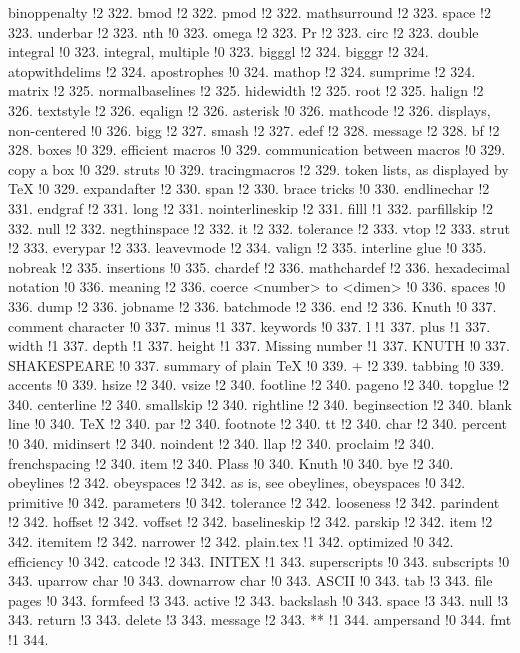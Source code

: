 binoppenalty !2 322.
bmod !2 322.
pmod !2 322.
mathsurround !2 323.
space !2 323.
underbar !2 323.
nth !0 323.
omega !2 323.
Pr !2 323.
circ !2 323.
double integral !0 323.
integral, multiple !0 323.
bigggl !2 324.
bigggr !2 324.
atopwithdelims !2 324.
apostrophes !0 324.
mathop !2 324.
sumprime !2 324.
matrix !2 325.
normalbaselines !2 325.
hidewidth !2 325.
root !2 325.
halign !2 326.
textstyle !2 326.
eqalign !2 326.
asterisk !0 326.
mathcode !2 326.
displays, non-centered !0 326.
bigg !2 327.
smash !2 327.
edef !2 328.
message !2 328.
bf !2 328.
boxes !0 329.
efficient macros !0 329.
communication between macros !0 329.
copy a box !0 329.
struts !0 329.
tracingmacros !2 329.
token lists, as displayed by TeX !0 329.
expandafter !2 330.
span !2 330.
brace tricks !0 330.
endlinechar !2 331.
endgraf !2 331.
long !2 331.
nointerlineskip !2 331.
filll !1 332.
parfillskip !2 332.
null !2 332.
negthinspace !2 332.
it !2 332.
tolerance !2 333.
vtop !2 333.
strut !2 333.
everypar !2 333.
leavevmode !2 334.
valign !2 335.
interline glue !0 335.
nobreak !2 335.
insertions !0 335.
chardef !2 336.
mathchardef !2 336.
hexadecimal notation !0 336.
meaning !2 336.
coerce <number> to <dimen> !0 336.
spaces !0 336.
dump !2 336.
jobname !2 336.
batchmode !2 336.
end !2 336.
Knuth !0 337.
comment character !0 337.
minus !1 337.
keywords !0 337.
l !1 337.
plus !1 337.
width !1 337.
depth !1 337.
height !1 337.
Missing number !1 337.
KNUTH !0 337.
SHAKESPEARE !0 337.
summary of plain TeX !0 339.
+ !2 339.
tabbing !0 339.
accents !0 339.
hsize !2 340.
vsize !2 340.
footline !2 340.
pageno !2 340.
topglue !2 340.
centerline !2 340.
smallskip !2 340.
rightline !2 340.
beginsection !2 340.
blank line !0 340.
TeX !2 340.
par !2 340.
footnote !2 340.
tt !2 340.
char !2 340.
percent !0 340.
midinsert !2 340.
noindent !2 340.
llap !2 340.
proclaim !2 340.
frenchspacing !2 340.
item !2 340.
Plass !0 340.
Knuth !0 340.
bye !2 340.
obeylines !2 342.
obeyspaces !2 342.
as is, see obeylines, obeyspaces !0 342.
primitive !0 342.
parameters !0 342.
tolerance !2 342.
looseness !2 342.
parindent !2 342.
hoffset !2 342.
voffset !2 342.
baselineskip !2 342.
parskip !2 342.
item !2 342.
itemitem !2 342.
narrower !2 342.
plain.tex !1 342.
optimized !0 342.
efficiency !0 342.
catcode !2 343.
INITEX !1 343.
superscripts !0 343.
subscripts !0 343.
uparrow char !0 343.
downarrow char !0 343.
ASCII !0 343.
tab !3 343.
file pages !0 343.
formfeed !3 343.
active !2 343.
backslash !0 343.
space !3 343.
null !3 343.
return !3 343.
delete !3 343.
message !2 343.
** !1 344.
ampersand !0 344.
fmt !1 344.
